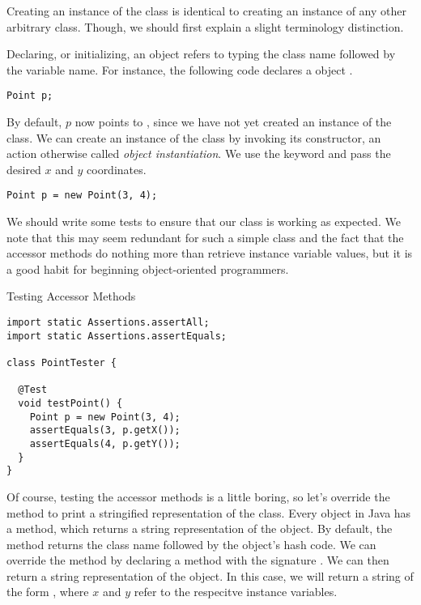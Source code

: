 Creating an instance of the  class is identical to creating an instance of any other arbitrary class. Though, we should first explain a slight terminology distinction.

Declaring, or initializing, an object refers to typing the class name followed by the variable name. For instance, the following code declares a  object .

\par{
\begin{verbatim}
Point p;
\end{verbatim}
}

By default, $p$ now points to , since we have not yet created an instance of the  class. We can create an instance of the  class by invoking its constructor, an action otherwise called \textit{object instantiation}. We use the  keyword and pass the desired $x$ and $y$ coordinates. 

\par{
\begin{verbatim}
Point p = new Point(3, 4);
\end{verbatim}
}

We should write some tests to ensure that our  class is working as expected. We note that this may seem redundant for such a simple class and the fact that the accessor methods do nothing more than retrieve instance variable values, but it is a good habit for beginning object-oriented programmers.

\begin{cl}{Testing Accessor Methods}
\begin{lstlisting}[language=MyJava]
import static Assertions.assertAll;
import static Assertions.assertEquals;

class PointTester {
  
  @Test
  void testPoint() {
    Point p = new Point(3, 4);
    assertEquals(3, p.getX());
    assertEquals(4, p.getY());
  }
}
\end{lstlisting}
\end{cl}

Of course, testing the accessor methods is a little boring, so let's override the  method to print a stringified representation of the  class. Every object in Java has a  method, which returns a string representation of the object. By default, the  method returns the class name followed by the object's hash code. We can override the  method by declaring a  method with the signature . We can then return a string representation of the object. In this case, we will return a string of the form , where $x$ and $y$ refer to the respecitve instance variables.

